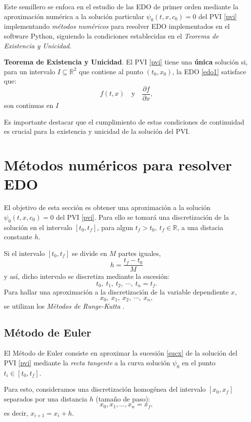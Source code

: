 \documentclass[12pt,letterpaper]{article}
\newcommand{\R}{\mathds{R}}
\begin{document}
Este semillero se enfoca en el estudio de las EDO de primer orden mediante la aproximación numérica a la solución particular $\psi_0(t,x,c_0)=0$ del PVI \eqref{pvi} implementando {\it métodos numéricos} para resolver EDO implementados en el software Python, siguiendo la condiciones establecidas en el {\it Teorema de Existencia y Unicidad}.

{\bf Teorema de Existencia y Unicidad}. El PVI \eqref{pvi} tiene una \textbf{única} solución si, para un intervalo $I\subseteq\R^2$ que contiene al punto $(t_0, x_0)$, la EDO \eqref{edo1} satisface que:
\[
    f(t, x) \quad \text{y} \quad \frac{\partial f}{\partial x}, 
\]
son continuas en $I$ \cite[pp. 43]{librozill}

Es importante destacar que el cumplimiento de estas condiciones de continuidad es crucial para la existencia y unicidad de la solución del PVI.

\section{Métodos numéricos para resolver EDO}
El objetivo de esta sección es obtener una aproximación a la solución $\psi_0(t,x,c_0)=0$ del PVI \eqref{pvi}. Para ello se tomará una discretización de la solución en el intervalo $[t_0,t_f]$, para algun $t_f>t_0,\ t_f\in\R$, a una distacia constante $h$.

Si el intervalo $[t_0,t_f]$ se divide en $M$ partes iguales, 
\[
h=\frac{t_f-t_0}{M}    
\]
y así, dicho intervalo se discretiza mediante la sucesión:
\[
t_0,\ t_1,\ t_2,\ \cdots,\ t_n=t_f.    
\]
Para hallar una aproximación a la discretización de la variable dependiente $x$,
\begin{equation}\label{sucx}
x_0,\ x_1,\ x_2,\ \cdots,\ x_n,    
\end{equation}
se utilizan los {\it Métodos de Runge-Kutta} \cite[pp.]{librozill}.

\subsection{Método de Euler}
El Método de Euler consiste en aproximar la sucesión \eqref{sucx} de la solución del PVI \eqref{pvi} mediante la {\it recta tangente} a la curva solución $\psi_0$ en el punto $t_i\in[t_0,t_f]$. 

Para esto, consideramos una discretización homogénea del intervalo \([x_0, x_f]\) separados por una distancia \(h\) (tamaño de paso):
\[
x_0, x_1, \ldots, x_n = x_f,
\]
es decir, \(x_{i+1} = x_i + h\).
\end{document}
